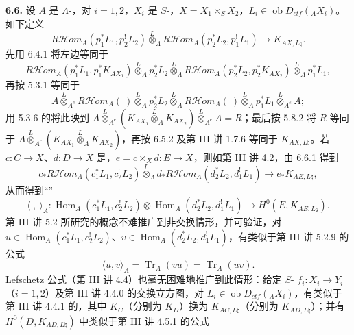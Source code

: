 \textbf{6.6.} 设 $A$ 是 $\Lambda$-，对 $i=1,2$，$X_i$ 是 $S$-，$X=X_1\times_SX_2$，$L_i\in\operatorname{ob}D_{ctf}({}_AX_i)$。如下定义
\begin{equation}R\mathcal H\!om_A(p_1^*L_1,p_2^!L_2)\overset L\otimes_\Lambda R\mathcal H\!om_A(p_2^*L_2,p_1^!L_1)\longrightarrow K_{AX,L\natural}.\tag{6.6.1}\end{equation}
先用 6.4.1 将左边等同于
\[R\mathcal H\!om_A(p_1^*L_1,p_1^*K_{AX_1})\overset L\otimes_Ap_2^*L_2\overset L\otimes_\Lambda R\mathcal H\!om_A(p_2^*L_2,p_2^*K_{AX_2})\overset L\otimes_Ap_1^*L_1,\]
再按 5.3.1 等同于
\[A\overset L\otimes_{A^e}R\mathcal H\!om_A(\ )\overset L\otimes_Ap_2^*L_2\overset L\otimes_A R\mathcal H\!om_A(\ )\overset L\otimes_Ap_1^*L_1\overset L\otimes_{A^e}A;\]
用 5.3.6 的将此映到 $A\overset L\otimes_{A^e}(K_{AX_1}\overset L\otimes_AK_{AX_2})\overset L\otimes_{A^e}A=R$；最后按 5.8.2 将 $R$ 等同于 $A\overset L\otimes_{A^e}(K_{AX_1}\overset L\otimes_AK_{AX_2})$，再按 6.5.2 及第 III 讲 1.7.6 等同于 $K_{AX,L\natural}$。若 $c:C\to X$、$d:D\to X$ 是，$e=c\times_Xd:E\to X$，则如第 III 讲 4.2，由 6.6.1 得到
\begin{equation}c_*R\mathcal H\!om_A(c_1^*L_1,c_2^!L_2)\overset L\otimes_\Lambda d_*R\mathcal H\!om_A(d_2^*L_2,d_1^!L_1)\longrightarrow e_*K_{AE,L\natural},\tag{6.6.2}\end{equation}
从而得到“”
\begin{equation}\langle\ ,\ \rangle_A:\operatorname{Hom}_A(c_1^*L_1,c_2^!L_2)\otimes\operatorname{Hom}_A(d_2^*L_2,d_1^!L_1)\longrightarrow H^0(E,K_{AE,L\natural}).\tag{6.6.3}\end{equation}
第 III 讲 5.2 所研究的概念不难推广到非交换情形，并可验证，对 $u\in\operatorname{Hom}_A(c_1^*L_1,c_2^!L_2)$、$v\in\operatorname{Hom}_A(d_2^*L_2,d_1^!L_1)$，有类似于第 III 讲 5.2.9 的公式
\begin{equation}\langle u,v\rangle_A=\operatorname{Tr}_A(vu)=\operatorname{Tr}_A(uv).\tag{6.6.4}\end{equation}
Lefschetz 公式（第 III 讲 4.4）也毫无困难地推广到此情形：给定 $S$- $f_i:X_i\to Y_i$（$i=1,2$）及第 III 讲 4.4.0 的交换立方图，对 $L_i\in\operatorname{ob}D_{ctf}({}_AX_i)$，有类似于第 III 讲 4.4.1 的，其中 $K_C$（分别为 $K_D$）换为 $K_{AC,L\natural}$（分别为 $K_{AD,L\natural}$）；并有 $H^0(D,K_{AD,L\natural})$ 中类似于第 III 讲 4.5.1 的公式
